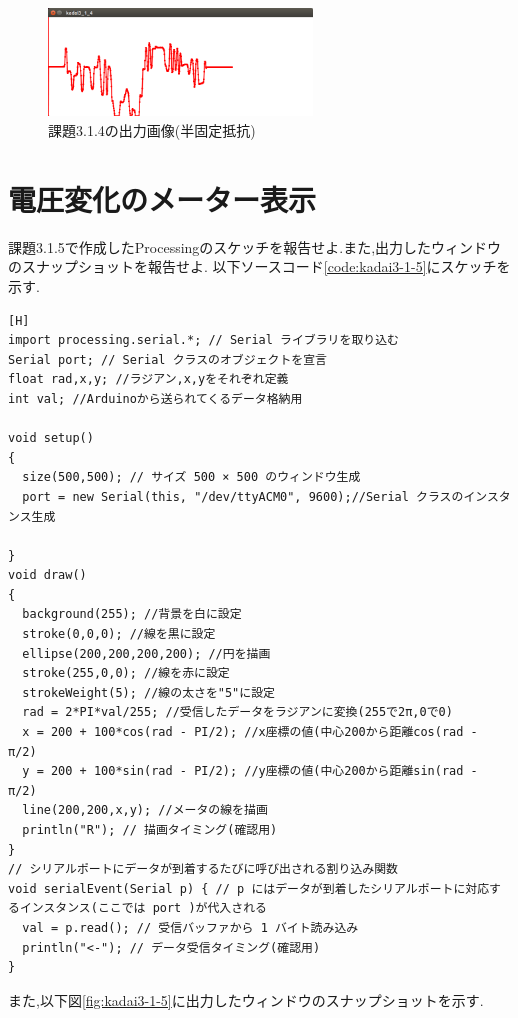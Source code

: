 \documentclass{jarticle}
\begin{document}
\begin{figure}[H]
\begin{center}
\includegraphics[width=7.0cm]{images/kadai3-1-4-1.png}
\caption{課題3.1.4の出力画像(半固定抵抗)}
\label{fig:kadai3-1-4-1}
\end{center}
\end{figure}


\section{電圧変化のメーター表示}
課題3.1.5で作成したProcessingのスケッチを報告せよ.また,出力したウィンドウのスナップショットを報告せよ.
以下ソースコード\ref{code:kadai3-1-5}にスケッチを示す.

\begin{lstlisting}[caption = 課題3.1.5,label=code:kadai3-1-5][H]
import processing.serial.*; // Serial ライブラリを取り込む
Serial port; // Serial クラスのオブジェクトを宣言
float rad,x,y; //ラジアン,x,yをそれぞれ定義
int val; //Arduinoから送られてくるデータ格納用

void setup()
{
  size(500,500); // サイズ 500 × 500 のウィンドウ生成
  port = new Serial(this, "/dev/ttyACM0", 9600);//Serial クラスのインスタンス生成

}
void draw()
{
  background(255); //背景を白に設定
  stroke(0,0,0); //線を黒に設定
  ellipse(200,200,200,200); //円を描画
  stroke(255,0,0); //線を赤に設定
  strokeWeight(5); //線の太さを"5"に設定
  rad = 2*PI*val/255; //受信したデータをラジアンに変換(255で2π,0で0)
  x = 200 + 100*cos(rad - PI/2); //x座標の値(中心200から距離cos(rad - π/2)
  y = 200 + 100*sin(rad - PI/2); //y座標の値(中心200から距離sin(rad - π/2)
  line(200,200,x,y); //メータの線を描画
  println("R"); // 描画タイミング(確認用)
}
// シリアルポートにデータが到着するたびに呼び出される割り込み関数
void serialEvent(Serial p) { // p にはデータが到着したシリアルポートに対応するインスタンス(ここでは port )が代入される
  val = p.read(); // 受信バッファから 1 バイト読み込み
  println("<-"); // データ受信タイミング(確認用)
}
\end{lstlisting}
また,以下図\ref{fig:kadai3-1-5}に出力したウィンドウのスナップショットを示す.
\end{document}
